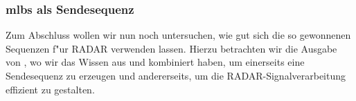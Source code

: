 \subsubsection{\texorpdfstring{\acrshort*{mlbs}}{MLBS} als Sendesequenz}
Zum Abschluss wollen wir nun noch untersuchen, wie gut sich die so gewonnenen Sequenzen f"ur RADAR verwenden lassen.
Hierzu betrachten wir die Ausgabe von , wo wir das Wissen aus  und  kombiniert haben, um einerseits  eine
Sendesequenz zu erzeugen und andererseits, um die RADAR-Signalverarbeitung effizient zu gestalten.
%
\begin{listing}[ht]
    \noindent
    \begin{minipage}{0.51\textwidth}
        \strut\vspace*{-\baselineskip}\newline
        \inputminted[firstline=3, lastline=19]{python3}{code/radar2.py}
    \end{minipage}%
    \begin{minipage}{0.48\textwidth}
        \strut\vspace*{-\baselineskip}\newline

\end{minipage}
\end{listing}
